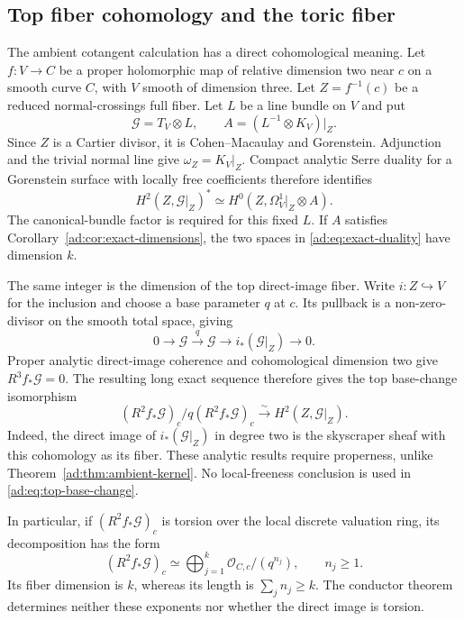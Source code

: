 \documentclass[11pt]{article}
\numberwithin{equation}{section}
\begin{document}
\subsection{Top fiber cohomology and the toric fiber}

The ambient cotangent calculation has a direct cohomological
meaning. Let $f:V\to C$ be a proper holomorphic map of relative
dimension two near $c$ on a smooth curve $C$, with $V$ smooth of
dimension three. Let $Z=f^{-1}(c)$ be a reduced
normal-crossings full fiber. Let $L$ be a line bundle on $V$ and put
\[
 \mathscr G=T_V\otimes L,\qquad A=(L^{-1}\otimes K_V)|_Z.
\]
Since $Z$ is a Cartier divisor, it is Cohen--Macaulay and
Gorenstein. Adjunction and the trivial normal line give
$\omega_Z=K_V|_Z$. Compact analytic Serre duality for a Gorenstein
surface with locally free coefficients therefore identifies
\begin{equation}\label{ad:eq:exact-duality}
 H^2(Z,\mathscr G|_Z)^*
 \simeq H^0(Z,\Omega_V^1|_Z\otimes A).
\end{equation}
The canonical-bundle factor is required for this fixed $L$.
If $A$ satisfies Corollary~\ref{ad:cor:exact-dimensions}, the two
spaces in \eqref{ad:eq:exact-duality} have dimension $k$.

The same integer is the dimension of the top direct-image fiber.
Write $i:Z\hookrightarrow V$ for the inclusion and choose a base
parameter $q$ at $c$. Its pullback is a non-zero-divisor on the
smooth total space, giving
\[
 0\longrightarrow\mathscr G\xrightarrow{q}\mathscr G
 \longrightarrow i_*(\mathscr G|_Z)\longrightarrow0.
\]
Proper analytic direct-image coherence and cohomological dimension
two give $R^3f_*\mathscr G=0$. The resulting long exact sequence
therefore gives the top base-change isomorphism
\begin{equation}\label{ad:eq:top-base-change}
 (R^2f_*\mathscr G)_c/q(R^2f_*\mathscr G)_c
 \xrightarrow{\sim}H^2(Z,\mathscr G|_Z).
\end{equation}
Indeed, the direct image of $i_*(\mathscr G|_Z)$ in degree two is
the skyscraper sheaf with this cohomology as its fiber.
These analytic results require properness, unlike
Theorem~\ref{ad:thm:ambient-kernel}. No local-freeness conclusion is
used in \eqref{ad:eq:top-base-change}.

In particular, if $(R^2f_*\mathscr G)_c$ is torsion over the local
discrete valuation ring, its decomposition has the form
\[
 (R^2f_*\mathscr G)_c\simeq
 \bigoplus_{j=1}^{k}\mathcal O_{C,c}/(q^{n_j}),\qquad n_j\ge1.
\]
Its fiber dimension is $k$, whereas its length is
$\sum_j n_j\ge k$. The conductor theorem determines neither these
exponents nor whether the direct image is torsion.
\end{document}
